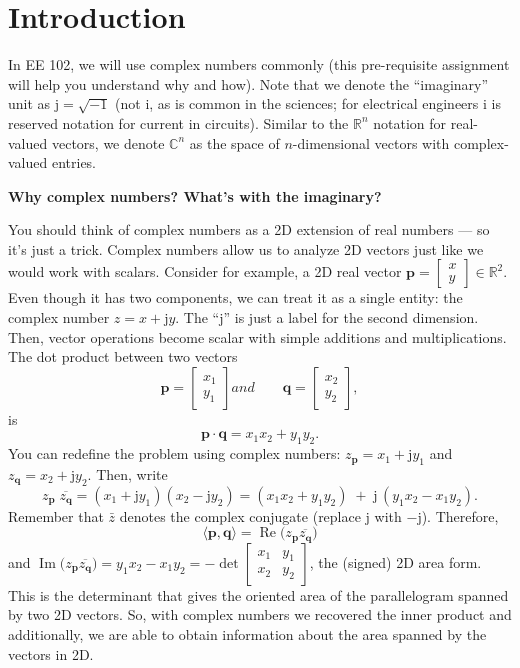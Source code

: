\documentclass{ee102_pset}
\author{\rule{3cm}{0.4pt}} %
\begin{document}
\header
\section*{Introduction}
In EE 102, we will use complex numbers commonly (this pre-requisite assignment will help you understand why and how). Note that we denote the ``imaginary'' unit as $\mathrm{j}=\sqrt{-1}$ (not $\mathrm{i}$, as is common in the sciences; for electrical engineers $\mathrm{i}$ is reserved notation for current in circuits). Similar to the $\mathbb{R}^n$ notation for real-valued vectors, we denote $\mathbb{C}^n$ as the space of $n$-dimensional vectors with complex-valued entries.

\textbf{Why complex numbers? What's with the imaginary?}

You should think of complex numbers as a 2D extension of real numbers --- so it's just a trick. Complex numbers allow us to analyze 2D vectors just like we would work with scalars. Consider for example, a 2D real vector $\textbf{p} = \begin{bmatrix}x\\y\end{bmatrix}\in\mathbb{R}^2$. Even though it has two components, we can treat it as a single entity: the complex number $z = x+\mathrm{j}y$. The ``$\mathrm{j}$'' is just a label for the second dimension. Then, vector operations become scalar with simple additions and multiplications. The dot product between two vectors
\[
\mathbf{p}=\begin{bmatrix}x_1\\y_1\end{bmatrix} and \qquad
\mathbf{q}=\begin{bmatrix}x_2\\y_2\end{bmatrix},
\]
is
\[
\mathbf{p}\cdot \mathbf{q} = x_1x_2 + y_1y_2.
\]
You can redefine the problem using complex numbers: \(z_{\mathbf{p}}=x_1+\mathrm{j}y_1\) and \(z_{\mathbf{q}}=x_2+\mathrm{j}y_2\).
Then, write
\[
z_{\mathbf{p}}\;\overline{z_{\mathbf{q}}}
= (x_1+\mathrm{j}y_1)(x_2-\mathrm{j}y_2)
= (x_1x_2+y_1y_2)\;+\;\mathrm{j}\,(y_1x_2 - x_1y_2).
\]
Remember that $\bar{z}$ denotes the complex conjugate (replace \( \mathrm{j} \) with \( -\mathrm{j} \)). Therefore,
\[
\boxed{\;\langle \mathbf{p},\mathbf{q}\rangle = \operatorname{Re}\!\big(z_{\mathbf{p}}\overline{z_{\mathbf{q}}}\big)\;}
\]
and \(\operatorname{Im}\!\big(z_{\mathbf{p}}\overline{z_{\mathbf{q}}}\big)=y_1x_2 - x_1y_2
= -\det\!\begin{bmatrix}x_1&y_1\\ x_2&y_2\end{bmatrix}\),
the (signed) 2D area form. This is the determinant that gives the oriented area of the parallelogram spanned by two 2D vectors. So, with complex numbers we recovered the inner product and additionally, we are able to obtain information about the area spanned by the vectors in 2D. 
\end{document}
